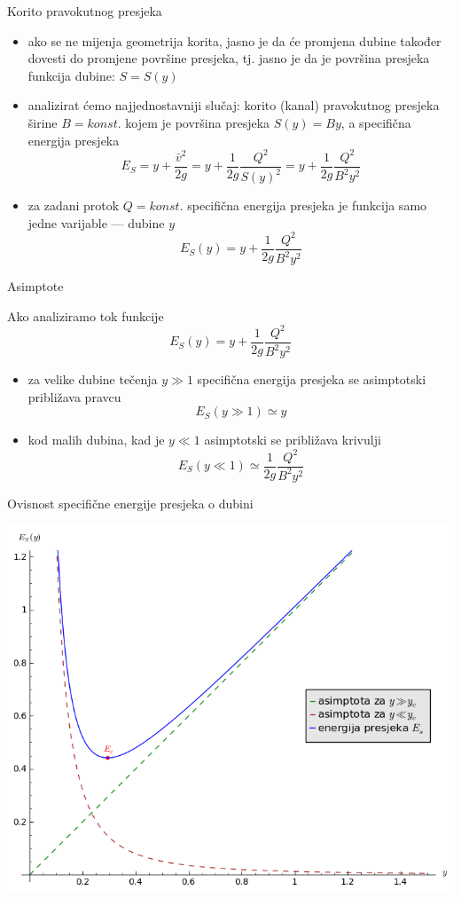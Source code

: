 \documentclass[croatian]{beamer}
\begin{document}
\begin{frame}{Korito pravokutnog presjeka}

\begin{itemize}
\item ako se ne mijenja geometrija korita, jasno je da će promjena dubine
također dovesti do promjene površine presjeka, tj. jasno je da je
površina presjeka funkcija dubine: $S=S(y)$
\item analizirat ćemo najjednostavniji slučaj: korito (kanal) pravokutnog
presjeka širine $B=konst.$ kojem je površina presjeka $S(y)=By$,
a specifična energija presjeka
\[
E_{S}=y+\frac{\bar{v}^{2}}{2g}=y+\frac{1}{2g}\frac{Q^{2}}{S(y)^{2}}=y+\frac{1}{2g}\frac{Q^{2}}{B^{2}y^{2}}
\]
\item za zadani protok $Q=konst.$ specifična energija presjeka je funkcija
samo jedne varijable --- dubine $y$
\[
E_{S}(y)=y+\frac{1}{2g}\frac{Q^{2}}{B^{2}y^{2}}
\]
\end{itemize}
\end{frame}

\begin{frame}{Asimptote}

Ako analiziramo tok funkcije
\[
E_{S}(y)=y+\frac{1}{2g}\frac{Q^{2}}{B^{2}y^{2}}
\]

\begin{itemize}
\item za velike dubine tečenja $y\gg1$ specifična energija presjeka se
asimptotski približava pravcu
\[
E_{S}(y\gg1)\simeq y
\]
\item kod malih dubina, kad je $y\ll1$ asimptotski se približava krivulji
\[
E_{S}(y\ll1)\simeq\frac{1}{2g}\frac{Q^{2}}{B^{2}y^{2}}
\]
\end{itemize}
\end{frame}

\begin{frame}{Ovisnost specifične energije presjeka o dubini}

\begin{center}
\includegraphics[height=0.7\paperheight]{slike/MF-10-kriticna-energija}
\par\end{center}

\end{frame}
\end{document}

